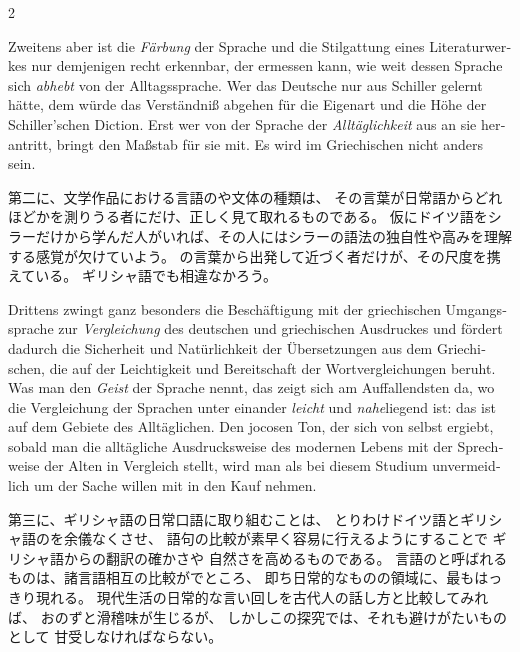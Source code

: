 \begin{paracol}{2}
\begin{german}
Zweitens aber ist die \emph{Färbung} der Sprache und die Stil\textcompwordmark{}gattung
eines Literatur\textcompwordmark{}werkes nur demjenigen recht erkennbar,
der ermessen kann, wie weit dessen Sprache sich \emph{abhebt} von
der Alltagssprache. Wer das Deutsche nur aus Schiller
gelernt hätte, dem würde das Verständniß abgehen
für die Eigenart und die Höhe der Schiller'schen Diction. Erst wer
von der Sprache der \emph{Alltäglichkeit} aus an sie herantritt,
bringt den Maßstab für sie mit. Es wird im Griechischen nicht anders
sein.
\end{german}
\switchcolumn

\begin{japanese}
第二に、文学作品における言語のや文体の種類は、
その言葉が日常語からどれほどかを測りうる者にだけ、正しく見て取れるものである。
仮にドイツ語をシラーだけから学んだ人がいれば、その人にはシラーの語法の独自性や高みを理解する感覚が欠けていよう。
の言葉から出発して近づく者だけが、その尺度を携えている。
ギリシャ語でも相違なかろう。
\end{japanese}
\switchcolumn*

\begin{german}
Drittens zwingt ganz besonders die Beschäftigung mit der griechischen
Um\textcompwordmark{}gangs\textcompwordmark{}sprache zur \emph{Vergleichung}
des deutschen und griechischen Ausdruckes und
fördert dadurch die Sicherheit und Natürlichkeit der Übersetzungen
aus dem Griechischen, die auf der Leichtigkeit und Bereitschaft
der Wortvergleichungen
beruht. Was man den \emph{Geist} der Sprache nennt, das zeigt sich
am Auffallendsten da, wo die Vergleichung der
Sprachen unter einander \emph{leicht} und \emph{nahe}liegend ist:
das ist auf dem Gebiete des Alltäglichen. Den jocosen Ton, der sich
von selbst ergiebt, sobald man die alltägliche Ausdrucksweise
des modernen Lebens mit der Sprechweise der Alten in Vergleich stellt,
wird man als bei diesem Studium unvermeidlich um der Sache willen
mit in den Kauf nehmen.
\end{german}
\switchcolumn

\begin{japanese}
第三に、ギリシャ語の日常口語に取り組むことは、
とりわけドイツ語とギリシャ語のを余儀なくさせ、
語句の比較が素早く容易に行えるようにすることで
ギリシャ語からの翻訳の確かさや
自然さを高めるものである。
言語のと呼ばれるものは、諸言語相互の比較がでところ、
即ち日常的なものの領域に、最もはっきり現れる。
現代生活の日常的な言い回しを古代人の話し方と比較してみれば、
おのずと滑稽味が生じるが、
しかしこの探究では、それも避けがたいものとして
甘受しなければならない。
\end{japanese}
\switchcolumn*


\end{paracol}
